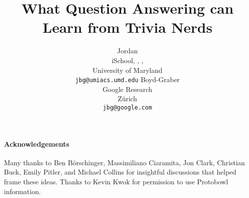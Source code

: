 \documentclass[table,times]{article}
\title{What Question Answering can Learn from Trivia Nerds}
\author{\hspace{4.4cm}Jordan \\ 
iSchool, \abr{cs}, \abr{umiacs}, \abr{lsc} \\
University of Maryland \\
\texttt{jbg@umiacs.umd.edu} \And 
\hspace{-5.2cm} Boyd-Graber \\
Google Research \\
Z\"urich \\
\texttt{jbg@google.com}}
\newcommand{\latexfile}[1]{}
\begin{document}
\maketitle

\latexfile{00-abstract}
\latexfile{10-intro}
\latexfile{20-tournaments}
\latexfile{30-craft}
\latexfile{60-qb}
\latexfile{90-call}

\paragraph{Acknowledgements}

Many thanks to Ben B\"orschinger, Massimiliano Ciaramita, Jon Clark, Christian Buck, Emily Pitler, and Michael Collins for insightful discussions that helped frame these ideas.  Thanks to Kevin Kwok for permission to use Protobowl information.



\end{document}
